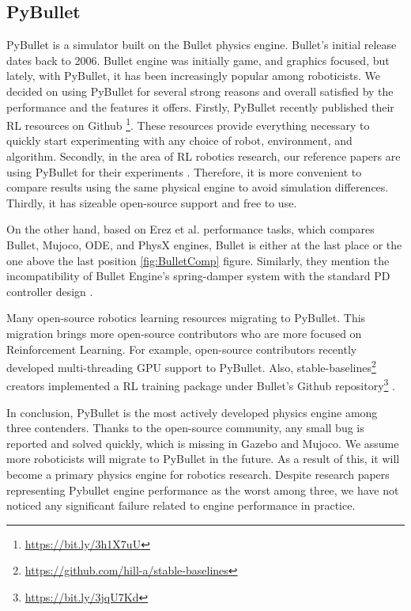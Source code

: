 \subsection{PyBullet}

PyBullet is a simulator built on the Bullet physics engine. Bullet’s initial release dates back to 2006. Bullet engine was initially game, and graphics focused, but lately, with PyBullet, it has been increasingly popular among roboticists. We decided on using PyBullet for several strong reasons and overall satisfied by the performance and the features it offers. Firstly, PyBullet recently published their RL resources on Github \footnote{\url{https://bit.ly/3h1X7uU}}. These resources provide everything necessary to quickly start experimenting with any choice of robot, environment, and algorithm. Secondly, in the area of RL robotics research, our reference papers are using PyBullet for their experiments \cite{Quillen2018} \cite{Breyer2018}. Therefore, it is more convenient to compare results using the same physical engine to avoid simulation differences. Thirdly, it has sizeable open-source support and free to use. 

On the other hand, based on Erez et al. performance tasks, which compares Bullet, Mujoco, ODE, and PhysX engines, Bullet is either at the last place or the one above the last position \ref{fig:BulletComp} figure. Similarly, they mention the incompatibility of Bullet Engine’s spring-damper system with the standard PD controller design \cite{Erez2015}.

Many open-source robotics learning resources migrating to PyBullet. This migration brings more open-source contributors who are more focused on Reinforcement Learning. For example, open-source contributors recently developed multi-threading GPU support to PyBullet. Also, stable-baselines\footnote{\url{https://github.com/hill-a/stable-baselines}} creators implemented a RL training package under Bullet’s Github repository\footnote{\url{https://bit.ly/3jqU7Kd}} \cite{stable-baselines}. 

In conclusion, PyBullet is the most actively developed physics engine among three contenders. Thanks to the open-source community, any small bug is reported and solved quickly, which is missing in Gazebo and Mujoco. We assume more roboticists will migrate to PyBullet in the future. As a result of this, it will become a primary physics engine for robotics research. Despite research papers representing Pybullet engine performance as the worst among three, we have not noticed any significant failure related to engine performance in practice.

